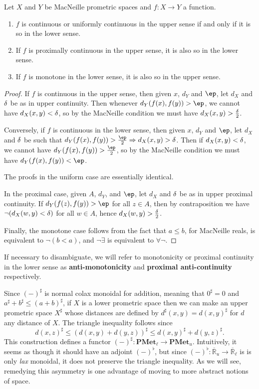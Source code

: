 \documentclass{article}
\def\R{\mathbb{R}}
\def\Re{\overline{\R}}
\def\Reu{\Re_u}
\def\Rel{\Re_{\ell}}
\def\upp#1{{#1}^{\sharp}}
\def\low#1{{#1}^{\flat}}
\let\implies\Rightarrow
\def\hfep{\frac{\ep}{2}}
\def\PMetu{\mathbf{PMet}_u}
\def\PMetl{\mathbf{PMet}_\ell}
\begin{document}
\begin{thm}\label{thm:anti-continuous}
  Let $X$ and $Y$ be MacNeille prometric spaces and $f:X\to Y$ a function.
  \begin{enumerate}
  \item $f$ is continuous or uniformly continuous in the upper sense if and only if it is so in the lower sense.
  \item If $f$ is proximally continuous in the upper sense, it is also so in the lower sense.
  \item If $f$ is monotone in the lower sense, it is also so in the upper sense.
  \end{enumerate}
\end{thm}
\begin{proof}
  If $f$ is continuous in the upper sense, then given $x$, $d_Y$ and $\ep$, let $d_X$ and $\delta$ be as in upper continuity.
  Then whenever $d_Y(f(x),f(y)) > \ep$, we cannot have $d_X(x,y) < \delta$, so by the MacNeille condition we must have $d_X(x,y) > \frac{\delta}{2}$.

  Conversely, if $f$ is continuous in the lower sense, then given $x$, $d_Y$ and $\ep$, let $d_X$ and $\delta$ be such that $d_Y(f(x),f(y))>\hfep \implies d_X(x,y)>\de$.
  Then if $d_X(x,y)<\delta$, we cannot have $d_Y(f(x),f(y))>\hfep$, so by the MacNeille condition we must have $d_Y(f(x),f(y))<\ep$.

  The proofs in the uniform case are essentially identical.

  In the proximal case, given $A$, $d_Y$, and $\ep$, let $d_X$ and $\delta$ be as in upper proximal continuity.
  If $d_Y(f(z),f(y))>\ep$ for all $z\in A$, then by contraposition we have $\neg (d_X(w,y)<\delta)$ for all $w\in A$, hence $d_X(w,y)>\frac{\delta}{2}$.

  Finally, the monotone case follows from the fact that $a\le b$, for MacNeille reals, is equivalent to $\neg(b<a)$, and $\neg\exists$ is equivalent to $\forall\neg$.
\end{proof}

If necessary to disambiguate, we will refer to monotonicity or proximal continuity in the lower sense as \textbf{anti-monotonicity} and \textbf{proximal anti-continuity} respectively.

\begin{rmk}
  Since $\upp{(-)}$ is normal colax monoidal for addition, meaning that $\upp{0} = 0$ and $\upp{a}+\upp{b} \le \upp{(a+b)}$, if $X$ is a lower prometric space then we can make an upper prometric space $\upp{X}$ whose distances are defined by $\upp{d}(x,y) = \upp{d(x,y)}$ for $d$ any distance of $X$.
  The triangle inequality follows since
  \[ \upp{d(x,z)} \le \upp{(d(x,y)+d(y,z))} \le \upp{d(x,y)} + \upp{d(y,z)}. \]
  This construction defines a functor $\upp{(-)} : \PMetl \to\PMetu$.
  Intuitively, it seems as though it should have an adjoint $\low{(-)}$, but since $\low{(-)}:\Reu \to \Rel$ is is only \emph{lax} monoidal, it does not preserve the triangle inequality.
  As we will see, remedying this asymmetry is one advantage of moving to more abstract notions of space.
\end{rmk}
\end{document}
